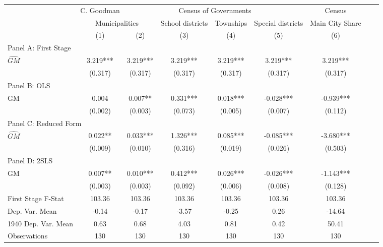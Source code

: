  \begin{tabular}{l*{8}{c}} \toprule
&\multicolumn{1}{c}{C. Goodman}&\multicolumn{4}{c}{Census of Governments}&\multicolumn{1}{c}{Census}\\\cmidrule(lr){2-2}\cmidrule(lr){3-6}\cmidrule(lr){7-7}
&\multicolumn{2}{c}{Municipalities}&\multicolumn{1}{c}{School districts}&\multicolumn{1}{c}{Townships}&\multicolumn{1}{c}{Special districts}&\multicolumn{1}{c}{Main City Share}\\\cmidrule(lr){2-3}\cmidrule(lr){4-6}\cmidrule(lr){7-7}
&\multicolumn{1}{c}{(1)}&\multicolumn{1}{c}{(2)}&\multicolumn{1}{c}{(3)}&\multicolumn{1}{c}{(4)}&\multicolumn{1}{c}{(5)}&\multicolumn{1}{c}{(6)}\\
\cmidrule(lr){1-7}
\multicolumn{6}{l}{Panel A: First Stage}\\
\cmidrule(lr){1-7}
$\widehat{GM}$  &    3.219***&    3.219***&    3.219***&    3.219***&    3.219***&    3.219***\\
                &  (0.317)   &  (0.317)   &  (0.317)   &  (0.317)   &  (0.317)   &  (0.317)   \\
\cmidrule(lr){1-7}
\multicolumn{6}{l}{Panel B: OLS}\\
\cmidrule(lr){1-7}
GM              &    0.004   &    0.007** &    0.331***&    0.018***&   -0.028***&   -0.939***\\
                &  (0.002)   &  (0.003)   &  (0.073)   &  (0.005)   &  (0.007)   &  (0.112)   \\
\cmidrule(lr){1-7}
\multicolumn{6}{l}{Panel C: Reduced Form}\\
\cmidrule(lr){1-7}
$\widehat{GM}$  &    0.022** &    0.033***&    1.326***&    0.085***&   -0.085***&   -3.680***\\
                &  (0.009)   &  (0.010)   &  (0.316)   &  (0.019)   &  (0.026)   &  (0.503)   \\
\cmidrule(lr){1-7}
\multicolumn{6}{l}{Panel D: 2SLS}\\
\cmidrule(lr){1-7}
GM              &    0.007** &    0.010***&    0.412***&    0.026***&   -0.026***&   -1.143***\\
                &  (0.003)   &  (0.003)   &  (0.092)   &  (0.006)   &  (0.008)   &  (0.128)   \\
\midrule
First Stage F-Stat&   103.36   &   103.36   &   103.36   &   103.36   &   103.36   &   103.36   \\
Dep. Var. Mean  &    -0.14   &    -0.17   &    -3.57   &    -0.25   &     0.26   &   -14.64   \\
1940 Dep. Var. Mean&     0.63   &     0.68   &     4.03   &     0.81   &     0.42   &    50.41   \\
Observations    &      130   &      130   &      130   &      130   &      130   &      130   \\
       \bottomrule \end{tabular}
